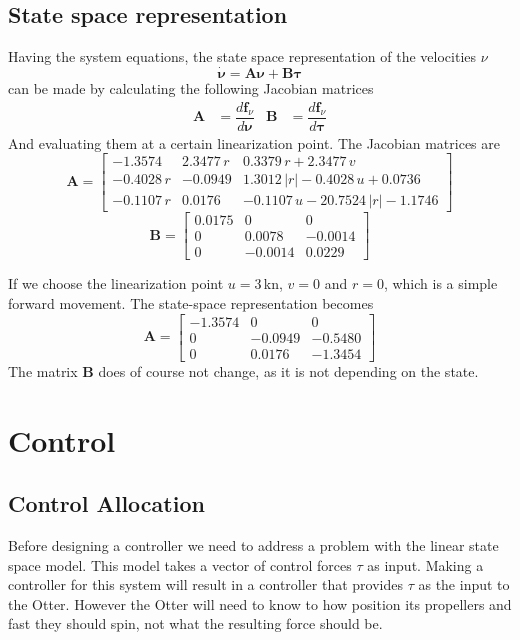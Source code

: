 \documentclass[12pt,a4]{article}
\begin{document}
\subsection{State space representation}
Having the system equations, the state space representation of the velocities $\nu$
\begin{equation}
	\bm{\dot{\nu}} = \bm{A \nu} + \bm{B \tau}
\end{equation}
can be made by calculating the following Jacobian matrices
\begin{align}
	\bm{A} & = \dfrac{d\bm{f}_\nu}{d\bm{\nu}} & \bm{B} & = \dfrac{d\bm{f}_\nu}{d\bm{\tau}}
\end{align}
And evaluating them at a certain linearization point. The Jacobian matrices are
\begin{equation}
	\bm{A} =     \left[\begin{array}{ccc} -1.3574 & 2.3477\,r & 0.3379\,r+2.3477\,v\\ -0.4028\,r & -0.0949 & 1.3012\,\left|r\right|-0.4028\,u+0.0736\\ -0.1107\,r & 0.0176 & -0.1107\,u-20.7524\,\left|r\right|-1.1746 \end{array}\right]
\end{equation}
\begin{equation}
	\bm{B}    =     \left[\begin{array}{ccc} 0.0175 & 0 & 0\\ 0 & 0.0078 & -0.0014\\ 0 & -0.0014 & 0.0229 \end{array}\right]
\end{equation}

If we choose the linearization point $u = 3\,$kn, $v = 0$ and $r = 0$, which is a simple forward movement. The state-space representation becomes
\begin{equation}
	\bm{A} = \left[\begin{array}{ccc} -1.3574 & 0 & 0\\ 0 & -0.0949 & -0.5480\\ 0 & 0.0176 & -1.3454 \end{array}\right]
\end{equation}
The matrix $\bm{B}$ does of course not change, as it is not depending on the state.


\section{Control}
\subsection{Control Allocation}
Before designing a controller we need to address a problem with the linear state space model. This model takes a vector of control forces $\tau$ as input.
Making a controller for this system will result in a controller that provides $\tau$ as the input to the Otter.
However the Otter will need to know to how position its propellers and fast they should spin, not what the resulting force should be.
\end{document}

